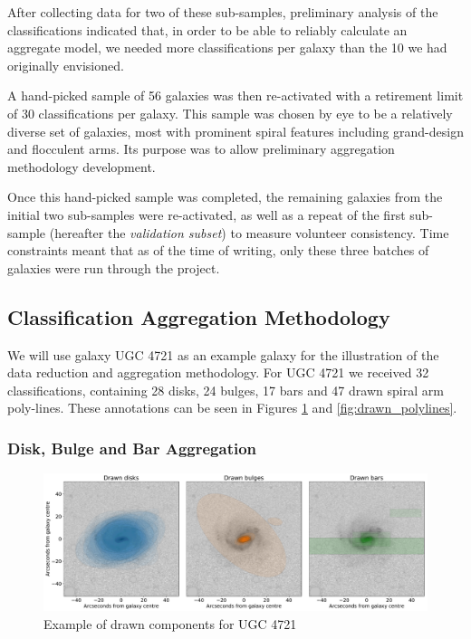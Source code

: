 \documentclass[../main.tex]{subfiles}
\begin{document}
After collecting data for two of these sub-samples, preliminary analysis of the classifications indicated that, in order to be able to reliably calculate an aggregate model, we needed more classifications per galaxy than the 10 we had originally envisioned.

A hand-picked sample of 56 galaxies was then re-activated with a retirement limit of 30 classifications per galaxy. This sample was chosen by eye to be a relatively diverse set of galaxies, most with prominent spiral features including grand-design and flocculent arms. Its purpose was to allow preliminary aggregation methodology development.

Once this hand-picked sample was completed, the remaining galaxies from the initial two sub-samples were re-activated, as well as a repeat of the first sub-sample (hereafter the \textit{validation subset}) to measure volunteer consistency. Time constraints meant that as of the time of writing, only these three batches of galaxies were run through the project.


\subsection{Classification Aggregation Methodology}

We will use galaxy UGC 4721 as an example galaxy for the illustration of the data reduction and aggregation methodology. For UGC 4721 we received 32 classifications, containing 28 disks, 24 bulges, 17 bars and 47 drawn spiral arm poly-lines. These annotations can be seen in Figures \ref{fig:drawn_shapes} and \ref{fig:drawn_polylines}.

\subsubsection{Disk, Bulge and Bar Aggregation}

\begin{figure}
  \includegraphics[width=15cm]{images__results/drawn_shapes.pdf}
  \caption{Example of drawn components for UGC 4721}
  \label{fig:drawn_shapes}
\end{figure}
\end{document}
